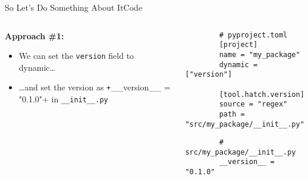 \begin{splitframe}[fragile]{So Let's Do Something About It}{Code}
  \begin{columns}[t,onlytextwidth]
    {
    \begin{column}{0.58\textwidth}
      \textbf{\textcolor{ccyan}{Approach \#1:}}
      \begin{itemize}
        \item We can set the \texttt{version} field to dynamic\dots
        \item \dots and set the version as \texttt+__version__ = "0.1.0"+
        in \texttt{\_\_init\_\_.py}
      \end{itemize}
    \end{column}
    }
    \begin{column}{0.38\textwidth}
      \begin{verbatim}
        # pyproject.toml
        [project]
        name = "my_package"
        dynamic = ["version"]

        [tool.hatch.version]
        source = "regex"
        path = "src/my_package/__init__.py"
      \end{verbatim}
      \vspace{1cm}
      \begin{verbatim}
        # src/my_package/__init__.py
        __version__ = "0.1.0"
      \end{verbatim}
    \end{column}
  \end{columns}
\end{splitframe}

